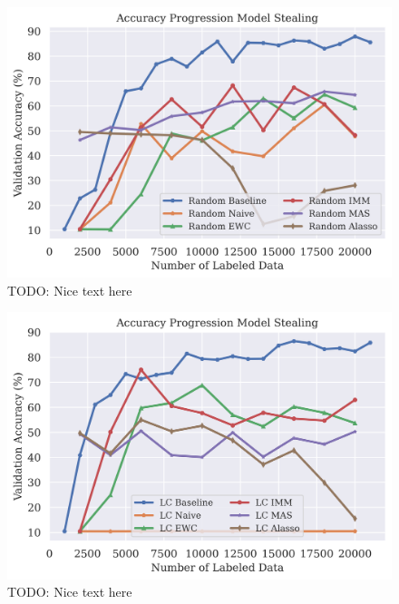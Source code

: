 \begin{figure}[h]
    \centering
    \includegraphics[width=0.8\linewidth]{images/results_CALMS/mnist_softmax_random.png}
    \caption[Accuracy Comparison for Model Stealing on MNIST using the softmax output and the Active Learning strategy Random]{TODO: Nice text here}
    \label{fig:CALMSMNISTSoftmaxRandom}
\end{figure}

\begin{figure}[h]
    \centering
    \includegraphics[width=0.8\linewidth]{images/results_CALMS/mnist_softmax_lc.png}
    \caption[Accuracy Comparison for Model Stealing on MNIST using the softmax output and the Active Learning strategy LC]{TODO: Nice text here}
    \label{fig:CALMSMNISTSoftmaxLC}
\end{figure}

